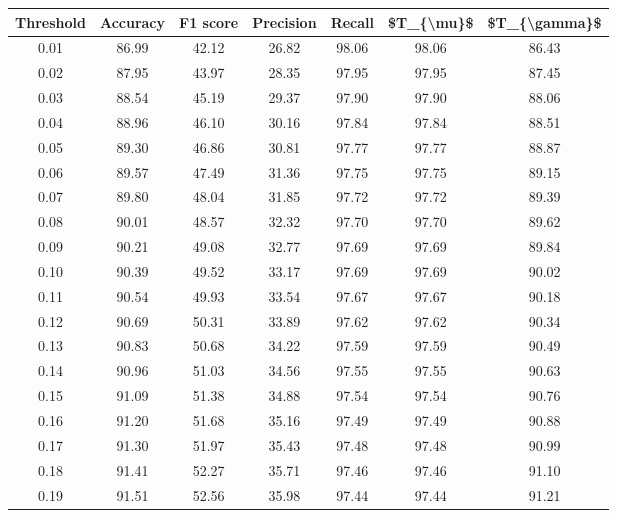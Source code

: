 \begin{tabular}{|c|c|c|c|c|c|c|}
\hline
 Threshold &  Accuracy &  F1 score &  Precision &  Recall &  \$T\_\{\textbackslash mu\}\$ &  \$T\_\{\textbackslash gamma\}\$ \\
\hline
      0.01 &     86.99 &     42.12 &      26.82 &   98.06 &      98.06 &         86.43 \\
      0.02 &     87.95 &     43.97 &      28.35 &   97.95 &      97.95 &         87.45 \\
      0.03 &     88.54 &     45.19 &      29.37 &   97.90 &      97.90 &         88.06 \\
      0.04 &     88.96 &     46.10 &      30.16 &   97.84 &      97.84 &         88.51 \\
      0.05 &     89.30 &     46.86 &      30.81 &   97.77 &      97.77 &         88.87 \\
      0.06 &     89.57 &     47.49 &      31.36 &   97.75 &      97.75 &         89.15 \\
      0.07 &     89.80 &     48.04 &      31.85 &   97.72 &      97.72 &         89.39 \\
      0.08 &     90.01 &     48.57 &      32.32 &   97.70 &      97.70 &         89.62 \\
      0.09 &     90.21 &     49.08 &      32.77 &   97.69 &      97.69 &         89.84 \\
      0.10 &     90.39 &     49.52 &      33.17 &   97.69 &      97.69 &         90.02 \\
      0.11 &     90.54 &     49.93 &      33.54 &   97.67 &      97.67 &         90.18 \\
      0.12 &     90.69 &     50.31 &      33.89 &   97.62 &      97.62 &         90.34 \\
      0.13 &     90.83 &     50.68 &      34.22 &   97.59 &      97.59 &         90.49 \\
      0.14 &     90.96 &     51.03 &      34.56 &   97.55 &      97.55 &         90.63 \\
      0.15 &     91.09 &     51.38 &      34.88 &   97.54 &      97.54 &         90.76 \\
      0.16 &     91.20 &     51.68 &      35.16 &   97.49 &      97.49 &         90.88 \\
      0.17 &     91.30 &     51.97 &      35.43 &   97.48 &      97.48 &         90.99 \\
      0.18 &     91.41 &     52.27 &      35.71 &   97.46 &      97.46 &         91.10 \\
      0.19 &     91.51 &     52.56 &      35.98 &   97.44 &      97.44 &         91.21 \\

\end{tabular}
